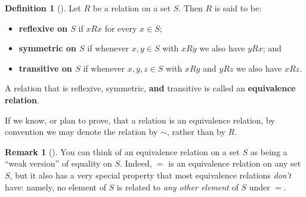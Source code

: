 \documentclass[10pt,openany,oneside]{book}
\newcommand{\terminology}[1]{\textbf{#1}}
\theoremstyle{plain}
\theoremstyle{definition}
\newtheorem{definition}[theorem]{Definition}
\theoremstyle{definition}
\newtheorem{remark}[theorem]{Remark}
\theoremstyle{definition}
\theoremstyle{definition}
\numberwithin{equation}{section}
\begin{document}
\begin{definition}[{}]\label{definition-56}
Let \(R\) be a relation on a set \(S\). Then \(R\) is said to be: \leavevmode%
\begin{itemize}[label=\textbullet]
\item{}\terminology{reflexive on \(S\)} if \(xR x\) for every \(x\in S\);%
\item{}\terminology{symmetric on \(S\)} if whenever \(x,y\in S\) with \(xR y\) we also have \(yR x\); and%
\item{}\terminology{transitive on \(S\)} if whenever \(x,y,z\in S\) with \(xR y\) and \(yR z\) we also have \(xR z\).%
\end{itemize}
%
\par
A relation that is reflexive, symmetric, \terminology{and} transitive is called an \terminology{equivalence relation}.%
\par
If we know, or plan to prove, that a relation is an equivalence relation, by convention we may denote the relation by \(\sim\), rather than by \(R\).%
\end{definition}
\begin{remark}[]\label{remark-35}
You can think of an equivalence relation on a set \(S\) as being a ``weak version'' of equality on \(S\).  Indeed, \(=\) is an equivalence relation on any set \(S\), but it also has a very special property that most equivalence relations \emph{don't} have: namely, no element of \(S\) is related to \emph{any other element} of \(S\) under \(=\).%
\end{remark}
\end{document}
